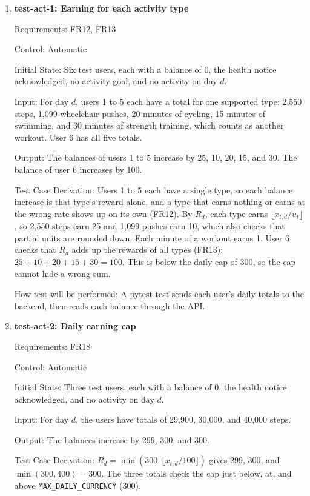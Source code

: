 \documentclass[12pt, titlepage]{article}
\begin{document}
\begin{enumerate}

\item{\textbf{test-act-1: Earning for each activity type}\\}

Requirements: FR12, FR13

Control: Automatic

Initial State: Six test users, each with a balance of 0, the health notice
acknowledged, no activity goal, and no activity on day $d$.

Input: For day $d$, users 1 to 5 each have a total for one supported type:
2,550 steps, 1,099 wheelchair pushes, 20 minutes of cycling, 15 minutes of
swimming, and 30 minutes of strength training, which counts as another
workout. User 6 has all five totals.

Output: The balances of users 1 to 5 increase by 25, 10, 20, 15, and 30. The
balance of user 6 increases by 100.

Test Case Derivation: Users 1 to 5 each have a single type, so each balance
increase is that type's reward alone, and a type that earns nothing or earns
at the wrong rate shows up on its own (FR12). By $R_d$, each type earns
$\lfloor x_{t,d} / u_t \rfloor$, so 2,550 steps earn 25 and 1,099 pushes earn
10, which also checks that partial units are rounded down. Each minute of a
workout earns 1. User 6 checks that $R_d$ adds up the rewards of all types
(FR13): $25 + 10 + 20 + 15 + 30 = 100$. This is below the daily cap of 300, so
the cap cannot hide a wrong sum.

How test will be performed: A pytest test sends each user's daily totals to
the backend, then reads each balance through the API.

\item{\textbf{test-act-2: Daily earning cap}\\}

Requirements: FR18

Control: Automatic

Initial State: Three test users, each with a balance of 0, the health notice
acknowledged, and no activity on day $d$.

Input: For day $d$, the users have totals of 29,900, 30,000, and 40,000 steps.

Output: The balances increase by 299, 300, and 300.

Test Case Derivation: $R_d = \min(300, \lfloor x_{t,d} / 100 \rfloor)$ gives
299, 300, and $\min(300, 400) = 300$. The three totals check the cap just
below, at, and above \texttt{MAX\_DAILY\_CURRENCY} (300).


\end{enumerate}
\end{document}
